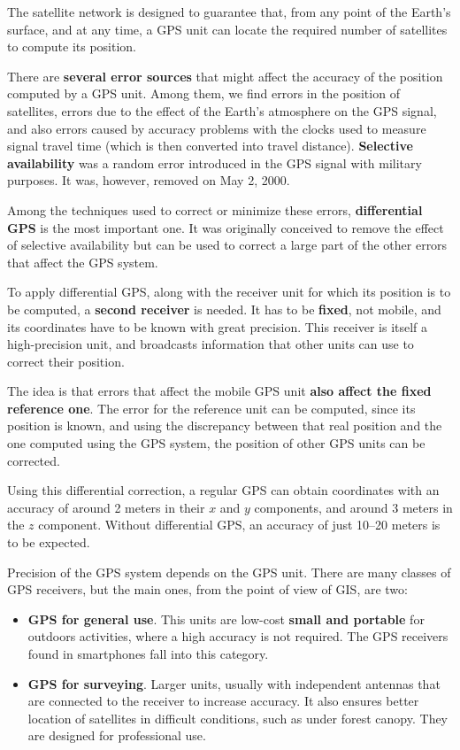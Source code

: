 The satellite network is designed to guarantee that, from any point of the Earth's surface, and at any time, a GPS unit can locate the required number of satellites to compute its position.

There are \textbf{several error sources} that might affect the accuracy of the position computed by a GPS unit. Among them, we find errors in the position of satellites, errors due to the effect of the Earth's atmosphere on the GPS signal, and also errors caused by accuracy problems with the clocks used to measure signal travel time (which is then converted into travel distance). \textbf{Selective availability} was a random error introduced in the GPS signal with military purposes. It was, however, removed on May 2, 2000.

Among the techniques used to correct or minimize these errors, \textbf{differential GPS} is the most important one. It was originally conceived to remove the effect of selective availability but can be used to correct a large part of the other errors that affect the GPS system.

To apply differential GPS, along with the receiver unit for which its position is to be computed, a \textbf{second receiver} is needed. It has to be \textbf{fixed}, not mobile, and its coordinates have to be known with great precision. This receiver is itself a high-precision unit, and broadcasts information that other units can use to correct their position. 

The idea is that errors that affect the mobile GPS unit \textbf{also affect the fixed reference one}. The error for the reference unit can be computed, since its position is known, and using the discrepancy between that real position and the one computed using the GPS system, the position of other GPS units can be corrected.

Using this differential correction, a regular GPS can obtain coordinates with an accuracy of around 2 meters in their $x$ and $y$ components, and around 3 meters in the $z$ component. Without differential GPS, an accuracy of just 10--20 meters is to be expected.

Precision of the GPS system depends on the GPS unit. There are many classes of GPS receivers, but the main ones, from the point of view of GIS, are two:

\begin{itemize}
	\item \textbf{GPS for general use}. This units are low-cost \textbf{small and portable} for outdoors activities, where a high accuracy is not required. The GPS receivers found in smartphones fall into this category.
	\item \textbf{GPS for surveying}. Larger units, usually with independent antennas that are connected to the receiver to increase accuracy. It also ensures better location of satellites in difficult conditions, such as under forest canopy. They are designed for professional use.
\end{itemize}	


